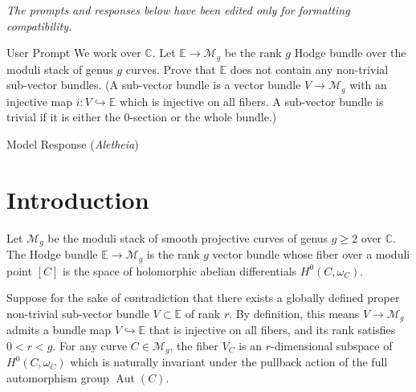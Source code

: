 \documentclass{article}
\date{}
\theoremstyle{plain}
\theoremstyle{definition}
\newcommand{\Aletheia}{\emph{Aletheia}}
\begin{document}
\emph{The prompts and responses below have been edited only for
formatting compatibility.}

\begin{problem}{User Prompt} We work over $\mathbb{C}$. Let $\mathbb{E} \to \mathcal{M}_{g}$ be the rank $g$ Hodge bundle over the moduli stack of genus $g$ curves. Prove that $\mathbb{E}$ does not contain any non-trivial sub-vector bundles.  (A sub-vector bundle is a vector bundle $V \to \mathcal{M}_{g}$ with an injective map $i : V \hookrightarrow \mathbb{E}$ which is injective on all fibers. A sub-vector bundle is trivial if it is either the 0-section or the whole bundle.)
\end{problem}

\begin{solution}{Model Response (\Aletheia)}
\begin{abstract}
We prove that the rank $g$ Hodge bundle $\mathbb{E} \to \mathcal{M}_g$ over the moduli stack of smooth complex algebraic curves of genus $g \ge 2$ admits no non-trivial proper sub-vector bundles. This is achieved by analyzing the equivariant characters of automorphisms on putative subbundles over specifically constructed loci of curves with a $(\mathbb{Z}/2\mathbb{Z})^2$-action. By extracting a rigid functional equation for the character traces, we categorically force the dimension of the isotypic invariant subspaces to be non-integral, yielding an algebraic contradiction.
\end{abstract}

\section{Introduction}
Let $\mathcal{M}_g$ be the moduli stack of smooth projective curves of genus $g \ge 2$ over $\mathbb{C}$. The Hodge bundle $\mathbb{E} \to \mathcal{M}_g$ is the rank $g$ vector bundle whose fiber over a moduli point $[C]$ is the space of holomorphic abelian differentials $H^0(C, \omega_C)$.

Suppose for the sake of contradiction that there exists a globally defined proper non-trivial sub-vector bundle $V \subset \mathbb{E}$ of rank $r$. By definition, this means $V \to \mathcal{M}_g$ admits a bundle map $V \hookrightarrow \mathbb{E}$ that is injective on all fibers, and its rank satisfies $0 < r < g$. For any curve $C \in \mathcal{M}_g$, the fiber $V_C$ is an $r$-dimensional subspace of $H^0(C, \omega_C)$ which is naturally invariant under the pullback action of the full automorphism group $\operatorname{Aut}(C)$.


\end{solution}
\end{document}
